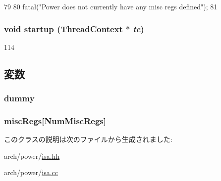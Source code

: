 \begin{DoxyCode}
79     {
80         fatal("Power does not currently have any misc regs defined\n");
81     }
\end{DoxyCode}
\hypertarget{classPowerISA_1_1ISA_a769e733729615c529fdb54f538f11dba}{
\subsubsection[{startup}]{\setlength{\rightskip}{0pt plus 5cm}void startup ({\bf ThreadContext} $\ast$ {\em tc})}}
\label{classPowerISA_1_1ISA_a769e733729615c529fdb54f538f11dba}



\begin{DoxyCode}
114 {}
\end{DoxyCode}


\subsection{変数}
\hypertarget{classPowerISA_1_1ISA_a704962a15f81135239eba94c00e2b269}{
\subsubsection[{dummy}]{ {\bf dummy}}}
\label{classPowerISA_1_1ISA_a704962a15f81135239eba94c00e2b269}
\hypertarget{classPowerISA_1_1ISA_a1719a90e78518ac5e323ce1fb9fe3639}{
\subsubsection[{miscRegs}]{ {\bf miscRegs}\mbox{[}{\bf NumMiscRegs}\mbox{]}}}
\label{classPowerISA_1_1ISA_a1719a90e78518ac5e323ce1fb9fe3639}


このクラスの説明は次のファイルから生成されました:\begin{DoxyCompactItemize}
\item 
arch/power/\hyperlink{power_2isa_8hh}{isa.hh}\item 
arch/power/\hyperlink{power_2isa_8cc}{isa.cc}\end{DoxyCompactItemize}

